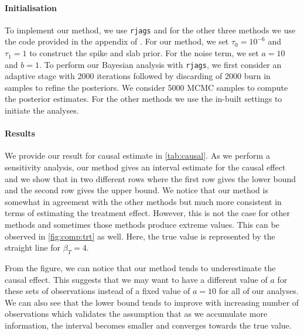 \documentclass{amsart}
\begin{document}
\paragraph{Initialisation} 
To implement our method, we use \texttt{rjags} and for the other three
methods we use the code provided in the appendix of \cite{koch2020}.
For our method, we set $\tau_0=10^{-6}$ and $\tau_1=1$ to construct the
spike and slab prior. For the noise term, we set $a=10$ and $b=1$.  To perform 
our Bayesian analysis with \texttt{rjags}, we first consider an adaptive 
stage with 2000 iterations followed by discarding of 2000 burn in samples 
to refine the posteriors. We consider 5000 MCMC samples to compute the
posterior estimates. For the other methods we use the in-built settings 
to initiate the analyses.

\paragraph{Results}
We provide our result for causal estimate in \cref{tab:causal}. 
As we perform a sensitivity analysis,
our method gives an interval estimate for the causal effect and we show
that in two different rows where the first row gives the lower bound
and the second row gives the upper bound. We notice that our method is 
somewhat in agreement with the other methods but much more consistent
in terms of estimating the treatment effect. However, this is not the
case for other methods and sometimes those methods produce extreme 
values. This can be observed in \cref{fig:comp:trt} as well. Here, the true 
value is represented by the straight line for $\beta_T = 4$. 

From the figure, we can notice that our method tends
to underestimate the causal effect. This suggests that
we may want to have a different value of $a$ for these sets of observations
instead of a fixed value of $a=10$ for all of our analyses.
We can also see that the lower bound tends to improve
with increasing number of observations which validates the assumption that as we accumulate
more information, the interval becomes smaller and converges towards
the true value.
\end{document}
